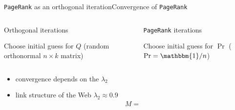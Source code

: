 \documentclass[xcolor=table,final]{beamer} %
\newcommand{\PageRank}{\texttt{PageRank}\xspace}
\newcommand{\ones}{\mathbbm{1}}
\begin{document}
\begin{frame}{\PageRank as an orthogonal iteration}{Convergence of \PageRank}
  \begin{columns}
    \begin{block}{Orthogonal iterations}
      \begin{algorithm}[H]
        \BlankLine

        Choose initial guess for $Q$ {\small (random orthonormal $n \times k$ matrix)} \;

      \end{algorithm}
    \end{block}
    \begin{block}{\PageRank iterations}
      \begin{algorithm}[H]
        \KwResult{$\Pr$}
        \BlankLine

        Choose initial guess for $\Pr$ {\small ($\Pr = \ones/n$)} \;

      \end{algorithm}
    \end{block}
  \end{columns}

\begin{itemize}\small
\item convergence depends on the $\lambda_2$
\item link structure of the Web $\lambda_2 \approx 0.9$
  \begin{align*}
    M = 
  \end{align*}
\end{itemize}

\end{frame}
\end{document}
